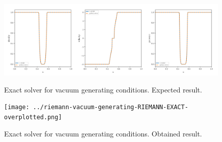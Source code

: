 \begin{figure}[htbp]
    \centering
	\includegraphics[width=.9\textwidth]{./figures/riemann-vacuum-generating-RIEMANN-EXACT-overplotted.png}%
	\caption{Exact solver for vacuum generating conditions. Expected result.}
	\texttt{[image: ../riemann-vacuum-generating-RIEMANN-EXACT-overplotted.png]}%
	\caption{Exact solver for vacuum generating conditions. Obtained result.}
\end{figure}







